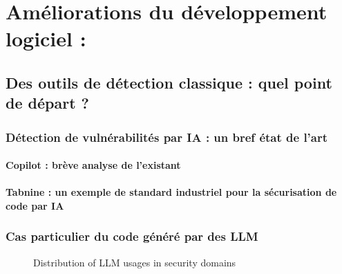 \chapter{Améliorations du développement logiciel : }
    \section{Des outils de détection classique : quel point de départ ?}
        \subsection{Détection de vulnérabilités par IA : un bref état de l'art}
            \subsubsection{Copilot : brève analyse de l'existant}
            \subsubsection{Tabnine : un exemple de standard industriel pour la sécurisation de code par IA}
        \subsection{Cas particulier du code généré par des LLM}
                \begin{figure}[H]
                    \centering
                    {}
                    \caption{Distribution of LLM usages in security domains \cite{citing4}}
                \end{figure}
